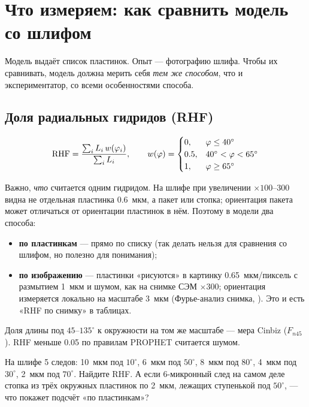 \chapter{Что измеряем: как сравнить модель со шлифом}\label{ch:measures}

Модель выдаёт список пластинок. Опыт --- фотографию шлифа. Чтобы их сравнивать, модель должна
мерить себя \emph{тем же способом}, что и экспериментатор, со всеми особенностями способа.

\section{Доля радиальных гидридов (RHF)}


\begin{keyf}[RHF]
\[
\mathrm{RHF}=\frac{\sum_i L_i\,w(\varphi_i)}{\sum_i L_i},\qquad
w(\varphi)=\begin{cases}0,&\varphi\le40^\circ\\0.5,&40^\circ<\varphi<65^\circ\\1,&\varphi\ge65^\circ\end{cases}
\]
\end{keyf}
Важно, \emph{что} считается одним гидридом. На шлифе при увеличении $\times100$--$300$ видна не
отдельная пластинка 0.6~мкм, а пакет или стопка; ориентация пакета может отличаться от ориентации
пластинок в нём. Поэтому в модели два способа:
\begin{itemize}
\item \textbf{по пластинкам} --- прямо по списку (так делать нельзя для сравнения со шлифом, но
  полезно для понимания);
\item \textbf{по изображению} --- пластинки «рисуются» в картинку 0.65~мкм/пиксель с размытием
  1~мкм и шумом, как на снимке СЭМ $\times300$; ориентация измеряется локально на масштабе 3~мкм
  (Фурье-анализ снимка, ). Это и есть «RHF по снимку» в таблицах.
\end{itemize}
Доля длины под $45$--$135^\circ$ к окружности на том же масштабе --- мера Cinbiz ($F_{n45}$).
RHF меньше 0.05 по правилам PROPHET считается шумом.

\begin{exercise}
На шлифе 5 следов: 10~мкм под $10^\circ$, 6~мкм под $50^\circ$, 8~мкм под $80^\circ$, 4~мкм под
$30^\circ$, 2~мкм под $70^\circ$. Найдите RHF. А если 6-микронный след на самом деле стопка из
трёх окружных пластинок по 2~мкм, лежащих ступенькой под $50^\circ$, --- что покажет подсчёт
«по пластинкам»?
\end{exercise}

